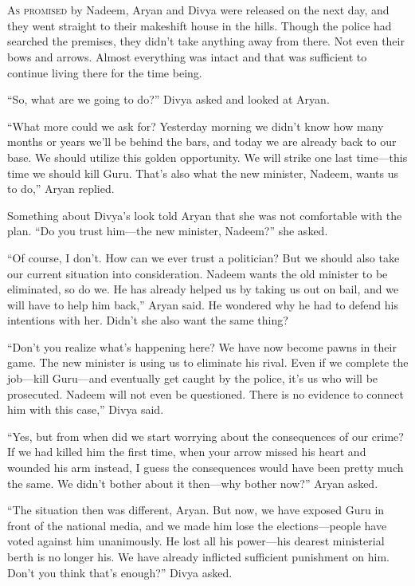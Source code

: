 \chapter{}

\lettrine{A}{s promised} by Nadeem, Aryan and Divya were released on the next
day, and they
went straight to their makeshift house in the hills. Though the police had
searched the premises, they didn't take anything away from there. Not even their
bows and arrows. Almost everything was intact and that was sufficient to
continue living there for the time being.

“So, what are we going to do?” Divya asked and looked at Aryan.

“What more could we ask for? Yesterday morning we didn't know how many months or
years we'll be behind the bars, and today we are already back to our base. We
should utilize this golden opportunity. We will strike one last time—this time
we should kill Guru. That's also what the new minister, Nadeem, wants us to do,”
Aryan replied.

Something about Divya's look told Aryan that she was not comfortable with the
plan. “Do you trust him—the new minister, Nadeem?” she asked.

“Of course, I don't. How can we ever trust a politician? But we should also take
our current situation into consideration. Nadeem wants the old minister to be
eliminated, so do we. He has already helped us by taking us out on bail, and we
will have to help him back,” Aryan said. He wondered why he had to defend his
intentions with her. Didn't she also want the same thing?

“Don't you realize what's happening here? We have now become pawns in their
game. The new minister is using us to eliminate his rival. Even if we complete
the job—kill Guru—and eventually get caught by the police, it's us who will
be prosecuted. Nadeem will not even be questioned. There is no evidence to
connect him with this case,” Divya said.

“Yes, but from when did we start worrying about the consequences of our crime?
If we had killed him the first time, when your arrow missed his heart and
wounded his arm instead, I guess the consequences would have been pretty much
the same. We didn't bother about it then—why bother now?” Aryan asked.

“The situation then was different, Aryan. But now, we have exposed Guru in front
of the national media, and we made him lose the elections—people have voted
against him unanimously. He lost all his power—his dearest ministerial berth
is no longer his. We have already inflicted sufficient punishment on him. Don't
you think that's enough?” Divya asked.

